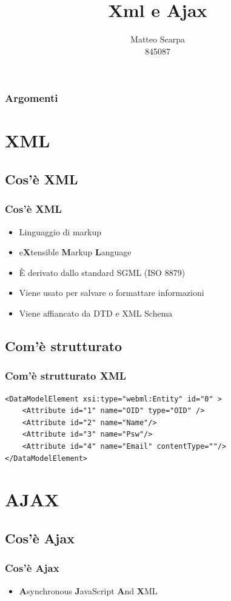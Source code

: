 \documentclass{beamer}
\title{Xml e Ajax}
\author{Matteo Scarpa\\ 845087}
\date{}
\institute{Università Ca'Foscari}
\begin{document}
\begin{frame}
   \maketitle
\end{frame}

\begin{frame}
   \frametitle{Argomenti}
   \tableofcontents[pausesections]
\end{frame}

\section{XML}

\subsection{Cos'è XML}
\begin{frame}
    \frametitle{Cos'è XML}
    \begin{itemize}
        \item Linguaggio di markup
        \item e\textbf{X}tensible \textbf{M}arkup \textbf{L}anguage
        \item È derivato dallo standard SGML (ISO 8879)
        \item Viene usato per salvare o formattare informazioni
        \item Viene affiancato da DTD e XML Schema
    \end{itemize}
\end{frame}

\subsection{Com'è strutturato}

\begin{frame}[fragile]
    \frametitle{Com'è strutturato XML}
    \begin{verbatim}
<DataModelElement xsi:type="webml:Entity" id="0" >       
    <Attribute id="1" name="OID" type="OID" /> 
    <Attribute id="2" name="Name"/> 
    <Attribute id="3" name="Psw"/> 
    <Attribute id="4" name="Email" contentType=""/> 
</DataModelElement> 
    \end{verbatim}
\end{frame}

\section{AJAX}
\subsection{Cos'è Ajax}

\begin{frame}
    \frametitle{Cos'è Ajax}
    \begin{itemize}
    \item \textbf{A}synchronous \textbf{J}avaScript \textbf{A}nd \textbf{X}ML
    \end{itemize}

\end{frame}
\end{document}
